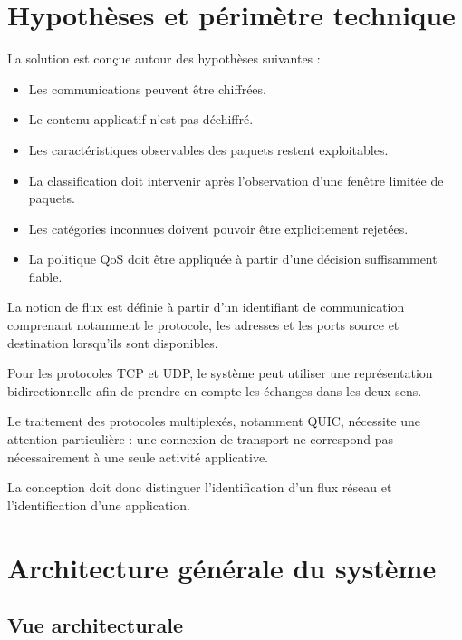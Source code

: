 \section{Hypothèses et périmètre technique}

La solution est conçue autour des hypothèses suivantes :

\begin{itemize}
    \item Les communications peuvent être chiffrées.
    \item Le contenu applicatif n'est pas déchiffré.
    \item Les caractéristiques observables des paquets
    restent exploitables.
    \item La classification doit intervenir après
    l'observation d'une fenêtre limitée de paquets.
    \item Les catégories inconnues doivent pouvoir être
    explicitement rejetées.
    \item La politique QoS doit être appliquée à partir
    d'une décision suffisamment fiable.
\end{itemize}

La notion de flux est définie à partir d'un identifiant
de communication comprenant notamment le protocole,
les adresses et les ports source et destination lorsqu'ils
sont disponibles.

Pour les protocoles TCP et UDP, le système peut utiliser
une représentation bidirectionnelle afin de prendre en
compte les échanges dans les deux sens.

Le traitement des protocoles multiplexés, notamment QUIC,
nécessite une attention particulière : une connexion
de transport ne correspond pas nécessairement à une
seule activité applicative.

La conception doit donc distinguer l'identification
d'un flux réseau et l'identification d'une application.

\section{Architecture générale du système}

\subsection{Vue architecturale}

